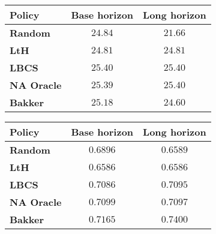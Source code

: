     \begin{figure}[h]
    \begin{minipage}[c]{0.48\textwidth}
    \begin{center}
        \begin{tabular}{lcc}
         \toprule
        \multirow{1}{*}{\textbf{Policy}}& Base horizon& Long horizon\\
        \midrule
        \textbf{Random} & $24.84$ & $21.66$ \\
        \textbf{LtH} & $24.81$ & $24.81$\\
        \textbf{LBCS} & $25.40$& $25.40$\\
        \textbf{NA Oracle}& $25.39$& $25.40$\\           
        \textbf{Bakker} & $25.18$& $24.60$ \\
        \bottomrule
        \end{tabular}
        \label{tab:bakker_comp_knee_psnr_25}     \end{center}
    \end{minipage}
    \hfill
    \begin{minipage}[c]{0.48\textwidth}
    \begin{center}
        \begin{tabular}{lcc}
            \toprule
           \multirow{1}{*}{\textbf{Policy}}& Base horizon& Long horizon\\
           \midrule
            \textbf{Random}& $0.6896$& $0.6589$ \\
            \textbf{LtH}& $0.6586$& $0.6586$\\
            \textbf{LBCS}& $0.7086$& $0.7095$\\
            \textbf{NA Oracle}& $0.7099$& $0.7097$\\           
            \textbf{Bakker}& $0.7165$& $0.7400$ \\
           \bottomrule
           \end{tabular}
           \label{tab:bakker_comp_knee_ssim_25} 
    \end{center}
    \end{minipage}
    \end{figure}